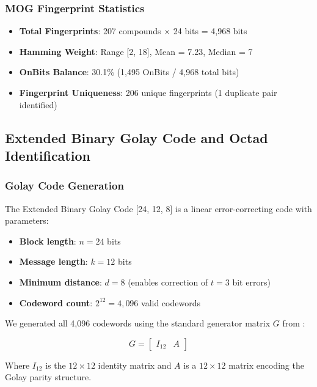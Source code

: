\documentclass[11pt,letterpaper]{article}
\begin{document}
\subsubsection{MOG Fingerprint Statistics}

\begin{itemize}
    \item \textbf{Total Fingerprints}: 207 compounds $\times$ 24 bits = 4,968 bits
    \item \textbf{Hamming Weight}: Range [2, 18], Mean = 7.23, Median = 7
    \item \textbf{OnBits Balance}: 30.1\% (1,495 OnBits / 4,968 total bits)
    \item \textbf{Fingerprint Uniqueness}: 206 unique fingerprints (1 duplicate pair identified)
\end{itemize}

\subsection{Extended Binary Golay Code and Octad Identification}

\subsubsection{Golay Code Generation}

The Extended Binary Golay Code [24, 12, 8] is a linear error-correcting code with parameters:
\begin{itemize}
    \item \textbf{Block length}: $n = 24$ bits
    \item \textbf{Message length}: $k = 12$ bits
    \item \textbf{Minimum distance}: $d = 8$ (enables correction of $t = 3$ bit errors)
    \item \textbf{Codeword count}: $2^{12} = 4,096$ valid codewords
\end{itemize}

We generated all 4,096 codewords using the standard generator matrix $G$ from \cite{MacWilliams1977}:

\begin{equation}
G = \begin{bmatrix}
I_{12} & A
\end{bmatrix}
\end{equation}

Where $I_{12}$ is the $12\times12$ identity matrix and $A$ is a $12\times12$ matrix encoding the Golay parity structure.
\end{document}
